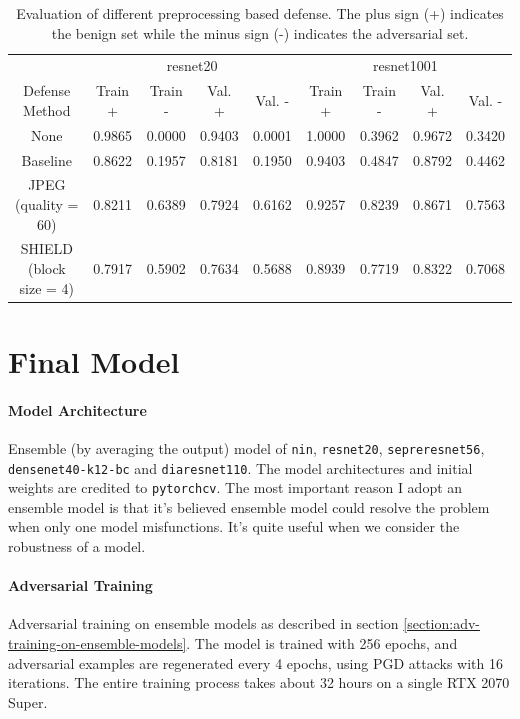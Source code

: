 \documentclass{article}
\begin{document}
\begin{table}[ht]
  \label{experiment:pgd-iterations}
  \centering
  \caption{Evaluation of different preprocessing based defense. The plus sign (+) indicates the
    benign set while the minus sign (-) indicates the adversarial set.}
  \begin{tabular}{ccccccccc}
    \toprule
    & \multicolumn{4}{c}{resnet20} & \multicolumn{4}{c}{resnet1001} \\
    \cmidrule(r){2-5} \cmidrule(r){6-9}
    Defense Method            & Train + & Train - & Val. +  & Val. -  & Train + & Train - & Val. +  & Val. -  \\
    \midrule
    None                      & 0.9865  & 0.0000  & 0.9403  & 0.0001  & 1.0000  & 0.3962  & 0.9672  & 0.3420  \\
    Baseline                  & 0.8622  & 0.1957  & 0.8181  & 0.1950  & 0.9403  & 0.4847  & 0.8792  & 0.4462  \\
    JPEG (quality = 60)       & 0.8211  & 0.6389  & 0.7924  & 0.6162  & 0.9257  & 0.8239  & 0.8671  & 0.7563  \\
    SHIELD (block size = 4)   & 0.7917  & 0.5902  & 0.7634  & 0.5688  & 0.8939  & 0.7719  & 0.8322  & 0.7068  \\
    \bottomrule
  \end{tabular}
\end{table}


\section{Final Model}
\paragraph{Model Architecture} Ensemble (by averaging the output) model of \texttt{nin},
\texttt{resnet20}, \texttt{sepreresnet56}, \texttt{densenet40-k12-bc} and \texttt{diaresnet110}.
The model architectures and initial weights are credited to \texttt{pytorchcv}\cite{imgcls}. The most important
reason I adopt an ensemble model is that it's believed ensemble model could resolve the problem
when only one model misfunctions. It's quite useful when we consider the robustness of a model.
\paragraph{Adversarial Training} Adversarial training on ensemble models as described in
section \ref{section:adv-training-on-ensemble-models}. The model is trained with 256 epochs, and
adversarial examples are regenerated every 4 epochs, using PGD attacks with 16 iterations. The
entire training process takes about 32 hours on a single RTX 2070 Super.
\end{document}
